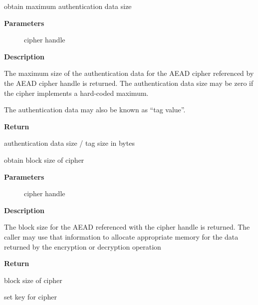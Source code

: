 \documentclass[a4paper,8pt,english]{sphinxmanual}
\begin{document}
\begin{fulllineitems}
\label{crypto/api-aead:c.crypto_aead_authsize}
obtain maximum authentication data size

\end{fulllineitems}


\textbf{Parameters}
\begin{description}
\item[{}] \leavevmode
cipher handle

\end{description}

\textbf{Description}

The maximum size of the authentication data for the AEAD cipher referenced
by the AEAD cipher handle is returned. The authentication data size may be
zero if the cipher implements a hard-coded maximum.

The authentication data may also be known as ``tag value''.

\textbf{Return}

authentication data size / tag size in bytes

\begin{fulllineitems}
\label{crypto/api-aead:c.crypto_aead_blocksize}
obtain block size of cipher

\end{fulllineitems}


\textbf{Parameters}
\begin{description}
\item[{}] \leavevmode
cipher handle

\end{description}

\textbf{Description}

The block size for the AEAD referenced with the cipher handle is returned.
The caller may use that information to allocate appropriate memory for the
data returned by the encryption or decryption operation

\textbf{Return}

block size of cipher

\begin{fulllineitems}
\label{crypto/api-aead:c.crypto_aead_setkey}
set key for cipher

\end{fulllineitems}
\end{document}
